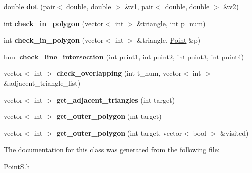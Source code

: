 \begin{DoxyCompactItemize}
double {\bfseries dot} (pair$<$ double, double $>$ \&v1, pair$<$ double, double $>$ \&v2)
\item 
\mbox{\label{class_point_s_a12f7b3d881e02f878aeaa4dd9fcb4834}} 
int {\bfseries check\+\_\+in\+\_\+polygon} (vector$<$ int $>$ \&triangle, int p\+\_\+num)
\item 
\mbox{\label{class_point_s_a4b2f77fa4174af7d2a8f0d0e844ec963}} 
int {\bfseries check\+\_\+in\+\_\+polygon} (vector$<$ int $>$ \&triangle, \mbox{\hyperlink{class_point}{Point}} \&p)
\item 
\mbox{\label{class_point_s_a73e47682f81d3d6221e441041fd10a0d}} 
bool {\bfseries check\+\_\+line\+\_\+intersection} (int point1, int point2, int point3, int point4)
\item 
\mbox{\label{class_point_s_a353b395c94536cc36a1c5094b02136f4}} 
vector$<$ int $>$ {\bfseries check\+\_\+overlapping} (int t\+\_\+num, vector$<$ int $>$ \&adjacent\+\_\+triangle\+\_\+list)
\item 
\mbox{\label{class_point_s_a604a80c965f2d57a86f88a381768f577}} 
vector$<$ int $>$ {\bfseries get\+\_\+adjacent\+\_\+triangles} (int target)
\item 
\mbox{\label{class_point_s_ad9820f7e074ee1dcb748f2f0dfaac4af}} 
vector$<$ int $>$ {\bfseries get\+\_\+outer\+\_\+polygon} (int target)
\item 
\mbox{\label{class_point_s_aeeaaa35ca3593fa2b2609030afb82da7}} 
vector$<$ int $>$ {\bfseries get\+\_\+outer\+\_\+polygon} (int target, vector$<$ bool $>$ \&visited)
\end{DoxyCompactItemize}


The documentation for this class was generated from the following file\+:\begin{DoxyCompactItemize}
\item 
Point\+S.\+h\end{DoxyCompactItemize}
